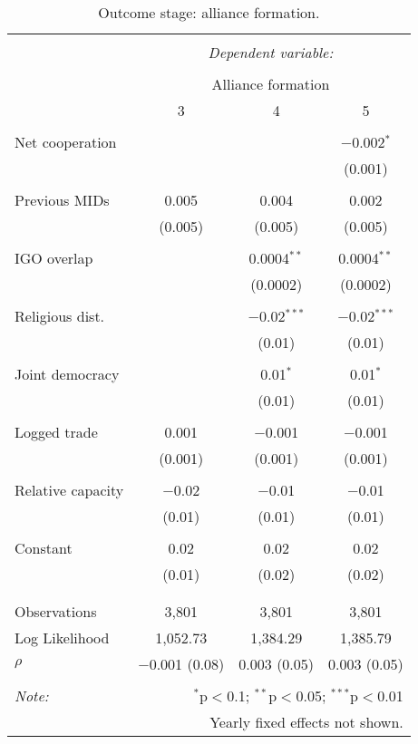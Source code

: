 \documentclass[10pt,]{article}
\begin{document}
\newpage

\begin{table}[!htbp] \centering 
  \caption{\label{tab:AllyTableOutcome}Outcome stage: alliance formation.} 
  \label{} 
\begin{tabular}{@{\extracolsep{5pt}}lccc} 
\\[-1.8ex]\hline 
\hline \\[-1.8ex] 
 & \multicolumn{3}{c}{\textit{Dependent variable:}} \\ 
\cline{2-4} 
\\[-1.8ex] & \multicolumn{3}{c}{Alliance formation} \\ 
 & 3 & 4 & 5 \\ 
\hline \\[-1.8ex] 
 Net cooperation &  &  & $-$0.002$^{*}$ \\ 
  &  &  & (0.001) \\ 
  & & & \\ 
 Previous MIDs & 0.005 & 0.004 & 0.002 \\ 
  & (0.005) & (0.005) & (0.005) \\ 
  & & & \\ 
 IGO overlap &  & 0.0004$^{**}$ & 0.0004$^{**}$ \\ 
  &  & (0.0002) & (0.0002) \\ 
  & & & \\ 
 Religious dist. &  & $-$0.02$^{***}$ & $-$0.02$^{***}$ \\ 
  &  & (0.01) & (0.01) \\ 
  & & & \\ 
 Joint democracy &  & 0.01$^{*}$ & 0.01$^{*}$ \\ 
  &  & (0.01) & (0.01) \\ 
  & & & \\ 
 Logged trade & 0.001 & $-$0.001 & $-$0.001 \\ 
  & (0.001) & (0.001) & (0.001) \\ 
  & & & \\ 
 Relative capacity & $-$0.02 & $-$0.01 & $-$0.01 \\ 
  & (0.01) & (0.01) & (0.01) \\ 
  & & & \\ 
 Constant & 0.02 & 0.02 & 0.02 \\ 
  & (0.01) & (0.02) & (0.02) \\ 
  & & & \\ 
\hline \\[-1.8ex] 
Observations & 3,801 & 3,801 & 3,801 \\ 
Log Likelihood & 1,052.73 & 1,384.29 & 1,385.79 \\ 
$\rho$ & $-$0.001  (0.08) & 0.003  (0.05) & 0.003  (0.05) \\ 
\hline 
\hline \\[-1.8ex] 
\textit{Note:}  & \multicolumn{3}{r}{$^{*}$p$<$0.1; $^{**}$p$<$0.05; $^{***}$p$<$0.01} \\ 
 & \multicolumn{3}{r}{Yearly fixed effects not shown.} \\ 
\end{tabular} 
\end{table}
\end{document}
